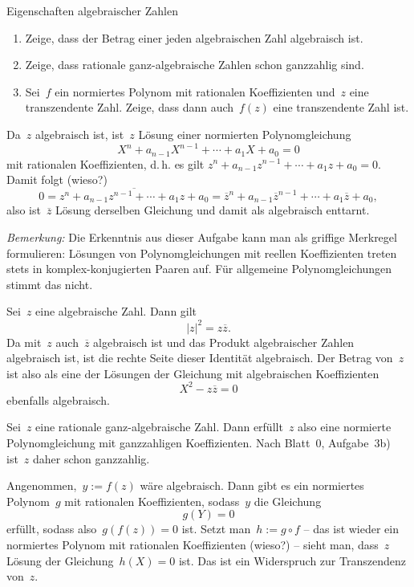 \documentclass{algblatt}
\begin{document}
\ifloesungen\newpage\fi
\begin{aufgabe}{Eigenschaften algebraischer Zahlen}
\begin{enumerate}
\item Zeige, dass der Betrag einer jeden algebraischen Zahl algebraisch ist.
\item Zeige, dass rationale ganz-algebraische Zahlen schon ganzzahlig sind.
\item Sei~$f$ ein normiertes Polynom mit rationalen Koeffizienten und~$z$ eine
transzendente Zahl. Zeige, dass dann auch~$f(z)$ eine transzendente Zahl ist.
\end{enumerate}
\begin{loesungE}
\item Da~$z$ algebraisch ist, ist~$z$ Lösung einer normierten Polynomgleichung
\[ X^n + a_{n-1} X^{n-1} + \cdots + a_1 X + a_0 = 0 \]
mit rationalen Koeffizienten, d.\,h. es gilt
$z^n + a_{n-1} z^{n-1} + \cdots + a_1 z + a_0 = 0$.
Damit folgt (wieso?)
\[ 0 = \overline{z^n + a_{n-1} z^{n-1} + \cdots + a_1 z + a_0} =
  \overline{z}^n + a_{n-1} \overline{z}^{n-1} + \cdots + a_1 \overline{z} + a_0, \]
also ist~$\overline{z}$ Lösung derselben Gleichung und damit als algebraisch
enttarnt.

\emph{Bemerkung:} Die Erkenntnis aus dieser Aufgabe kann man als griffige
Merkregel formulieren: Lösungen von Polynomgleichungen mit reellen
Koeffizienten treten stets in komplex-konjugierten Paaren auf. Für allgemeine
Polynomgleichungen stimmt das nicht.

\item Sei~$z$ eine algebraische Zahl. Dann gilt
\[ |z|^2 = z \overline{z}. \]
Da mit~$z$ auch~$\overline{z}$ algebraisch ist und das Produkt algebraischer
Zahlen algebraisch ist, ist die rechte Seite dieser Identität algebraisch. Der
Betrag von~$z$ ist also als eine der Lösungen der Gleichung mit algebraischen
Koeffizienten
\[ X^2 - z \overline{z} = 0 \]
ebenfalls algebraisch.
\item Sei~$z$ eine rationale ganz-algebraische Zahl. Dann erfüllt~$z$ also eine
normierte Polynomgleichung mit ganzzahligen Koeffizienten. Nach Blatt~0,
Aufgabe~3b) ist~$z$ daher schon ganzzahlig.
\item Angenommen,~$y := f(z)$ wäre algebraisch. Dann gibt es ein normiertes
Polynom~$g$ mit rationalen Koeffizienten, sodass~$y$ die Gleichung
\[ g(Y) = 0 \]
erfüllt, sodass also~$g(f(z)) = 0$ ist. Setzt man~$h := g \circ f$ -- das ist
wieder ein normiertes Polynom mit rationalen Koeffizienten (wieso?) -- sieht
man, dass~$z$ Lösung der Gleichung~$h(X) = 0$ ist. Das ist ein Widerspruch zur
Transzendenz von~$z$.
\end{loesungE}
\end{aufgabe}
\end{document}
